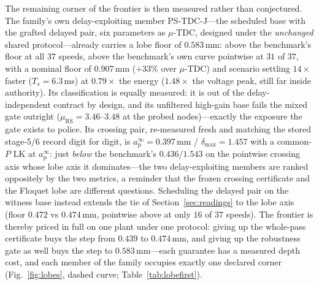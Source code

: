 \documentclass[preprint,12pt]{elsarticle}
\newcommand{\ap}{a_{\mathrm{p}}}
\newcommand{\muRS}{\mu_{\mathrm{RS}}}
\begin{document}
The remaining corner of the frontier is then measured rather than
conjectured.  The family's own delay-exploiting member
PS-TDC-J---the scheduled base with the grafted delayed pair, six
parameters as $\mu$-TDC, designed under the \emph{unchanged} shared
protocol---already carries a lobe floor of $0.583$\,mm: above the
benchmark's floor at all $37$ speeds, above the benchmark's own curve
pointwise at $31$ of $37$, with a nominal floor of $0.907$\,mm
($+33\%$ over $\mu$-TDC) and scenario settling $14\times$ faster
($T_s = 6.3$\,ms) at $0.79\times$ the energy ($1.48\times$ the
voltage peak, still far inside authority).  Its classification is
equally measured: it is out of the delay-independent contract by
design, and its unfiltered high-gain base fails the mixed gate
outright ($\muRS = 3.46$--$3.48$ at the probed nodes)---exactly the
exposure the gate exists to police.  Its crossing pair, re-measured
fresh and matching the stored stage-5/6 record digit for digit, is
$\ap^{\infty} = 0.397$\,mm / $\delta_{\max} = 1.457$ with a common-$P$
LK at $\ap^{\infty}$: just \emph{below} the benchmark's
$0.436$/$1.543$ on the pointwise crossing axis whose lobe axis it
dominates---the two delay-exploiting members are ranked oppositely by
the two metrics, a reminder that the frozen crossing certificate and
the Floquet lobe are different questions.  Scheduling the delayed
pair on
the witness base instead extends the tie of
Section~\ref{sec:readings} to the lobe axis (floor $0.472$ vs
$0.474$\,mm, pointwise above at only $16$ of $37$ speeds).  The
frontier is thereby priced in full on one plant under one protocol:
giving up the whole-pass certificate buys the step from $0.439$ to
$0.474$\,mm, and giving up the robustness gate as well buys the step
to $0.583$\,mm---each guarantee has a measured depth cost, and each
member of the family occupies exactly one declared corner
(Fig.~\ref{fig:lobes}, dashed curve; Table~\ref{tab:lobefirst}).
\end{document}

